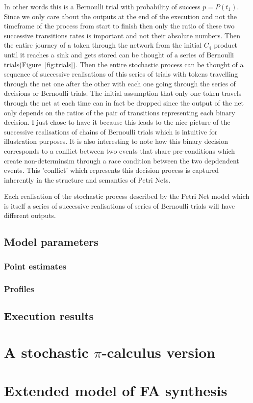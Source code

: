 In other words this is a Bernoulli trial with probability of success
$p = P(t_1)$. Since we only care about the outputs at the end of the
execution and not the timeframe of the process from start to finish
then only the ratio of these two successive transitions rates is
important and not their absolute numbers. Then the entire journey of a token through the network
from the initial $C_4$ product until it reaches a sink and gets stored
can be thought of a series of Bernoulli
trials(Figure~\ref{fig:trials}). Then the entire stochastic process
can be thought of a sequence of successive realisations of this series
of trials with tokens travelling through the net one
after the other with each one going through the series of decisions
or Bernoulli trials. The initial assumption that only one token
travels through the net at each time can in fact be dropped since the
output of the net only depends on the ratios of the pair of
transitions representing each binary decision. I just chose to have it
because this leads to the nice picture of the successive realisations
of chains of Bernoulli trials which is intuitive for illustration
purposes.
It is also interesting to note how this binary decision
corresponds to a conflict between two events that share pre-conditions
which create non-determinsim through a race condition between the two
depdendent events. This 'conflict' which represents this decision
process is captured inherently in the structure and semantics of Petri
Nets. 

Each realisation of the stochastic process described by the Petri Net
model which is itself a series of successive realisations of series of
Bernoulli trials will have different outputs. 







\subsection{Model parameters}

\subsubsection{Point estimates}

\subsubsection{Profiles}

\subsection{Execution results}



\section{A stochastic $\pi$-calculus version}





\section{Extended model of FA synthesis}

